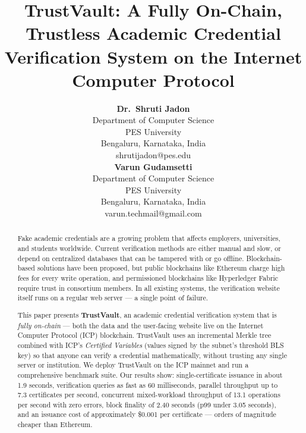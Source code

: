 \documentclass[journal]{IEEEtran}
\begin{document}
\title{TrustVault: A Fully On-Chain, Trustless Academic Credential Verification System on the Internet Computer Protocol}

\author{%
  \begin{tabular}[t]{c}
    \textbf{Dr.\ Shruti Jadon} \\
    Department of Computer Science \\
    PES University \\
    Bengaluru, Karnataka, India \\
    shrutijadon@pes.edu
  \end{tabular}
  \hspace{1.5cm}
  \begin{tabular}[t]{c}
    \textbf{Varun Gudamsetti} \\
    Department of Computer Science \\
    PES University \\
    Bengaluru, Karnataka, India \\
    varun.techmail@gmail.com
  \end{tabular}
}



\maketitle

\begin{abstract}
Fake academic credentials are a growing problem that affects employers, universities, and students worldwide. Current verification methods are either manual and slow, or depend on centralized databases that can be tampered with or go offline. Blockchain-based solutions have been proposed, but public blockchains like Ethereum charge high fees for every write operation, and permissioned blockchains like Hyperledger Fabric require trust in consortium members. In all existing systems, the verification website itself runs on a regular web server — a single point of failure.

This paper presents \textbf{TrustVault}, an academic credential verification system that is \emph{fully on-chain} — both the data and the user-facing website live on the Internet Computer Protocol (ICP) blockchain. TrustVault uses an incremental Merkle tree combined with ICP's \emph{Certified Variables} (values signed by the subnet's threshold BLS key) so that anyone can verify a credential mathematically, without trusting any single server or institution. We deploy TrustVault on the ICP mainnet and run a comprehensive benchmark suite. Our results show: single-certificate issuance in about 1.9 seconds, verification queries as fast as 60 milliseconds, parallel throughput up to 7.3 certificates per second, concurrent mixed-workload throughput of 13.1 operations per second with zero errors, block finality of 2.40 seconds (p99 under 3.05 seconds), and an issuance cost of approximately \$0.001 per certificate — orders of magnitude cheaper than Ethereum.
\end{abstract}
\end{document}
